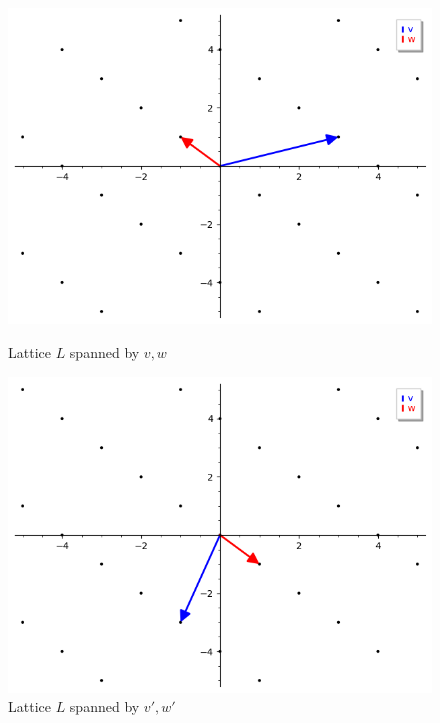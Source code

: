 \documentclass[a4paper,12pt]{report}
\begin{document}
\begin{figure}[H]
    \begin{minipage}[b]{0.50\textwidth}
        \includegraphics[width=\textwidth]{./img/lattice_b0.png}
        \caption{Lattice $L$ spanned by $v, w$}
        \label{fig:lattice0}
    \end{minipage}
    \hspace{\fill}
    \begin{minipage}[b]{0.50\textwidth}
        \includegraphics[width=\textwidth]{./img/lattice_b1.png}
        \caption{Lattice $L$ spanned by $v', w'$}
        \label{fig:lattice1}
    \end{minipage}
\end{figure}
\end{document}
